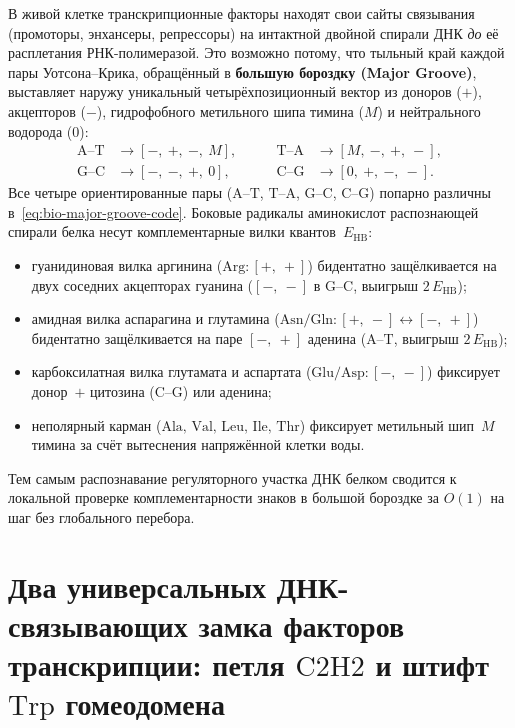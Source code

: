 В живой клетке транскрипционные факторы находят свои сайты связывания (промоторы, энхансеры, репрессоры) на интактной двойной спирали ДНК \emph{до} её расплетания РНК-полимеразой.
Это возможно потому, что тыльный край каждой пары Уотсона--Крика, обращённый в \textbf{большую бороздку (Major Groove)}, выставляет наружу уникальный четырёхпозиционный вектор из доноров ($+$), акцепторов ($-$), гидрофобного метильного шипа тимина ($M$) и нейтрального водорода ($0$):
\begin{equation}
\label{eq:bio-major-groove-code}
\begin{aligned}
  \text{A--T} &\longrightarrow [-,\ +,\ -,\ M], &\qquad
  \text{T--A} &\longrightarrow [M,\ -,\ +,\ -], \\
  \text{G--C} &\longrightarrow [-,\ -,\ +,\ 0], &\qquad
  \text{C--G} &\longrightarrow [0,\ +,\ -,\ -].
\end{aligned}
\end{equation}
Все четыре ориентированные пары ($\text{A--T}$, $\text{T--A}$, $\text{G--C}$, $\text{C--G}$) попарно различны в~\eqref{eq:bio-major-groove-code}.
Боковые радикалы аминокислот распознающей спирали белка несут комплементарные вилки квантов~$E_{\mathrm{HB}}$:
\begin{itemize}[noitemsep]
\item гуанидиновая вилка аргинина ($\text{Arg}: [+,\ +]$) бидентатно защёлкивается на двух соседних акцепторах гуанина ($[-,\ -]$ в $\text{G--C}$, выигрыш $2\,E_{\mathrm{HB}}$);
\item амидная вилка аспарагина и глутамина ($\text{Asn/Gln}: [+,\ -]\leftrightarrow [-,\ +]$) бидентатно защёлкивается на паре $[-,\ +]$ аденина ($\text{A--T}$, выигрыш $2\,E_{\mathrm{HB}}$);
\item карбоксилатная вилка глутамата и аспартата ($\text{Glu/Asp}: [-,\ -]$) фиксирует донор~$+$ цитозина ($\text{C--G}$) или аденина;
\item неполярный карман ($\text{Ala, Val, Leu, Ile, Thr}$) фиксирует метильный шип~$M$ тимина за счёт вытеснения напряжённой клетки воды.
\end{itemize}
Тем самым распознавание регуляторного участка ДНК белком сводится к локальной проверке комплементарности знаков в большой бороздке за $O(1)$ на шаг без глобального перебора.

\section{Два универсальных ДНК-связывающих замка факторов транскрипции: петля \texorpdfstring{$\text{C2H2}$}{C2H2} и штифт \texorpdfstring{$\text{Trp}$}{Trp} гомеодомена}
\label{sec:bio-tf-dbd-locks}


